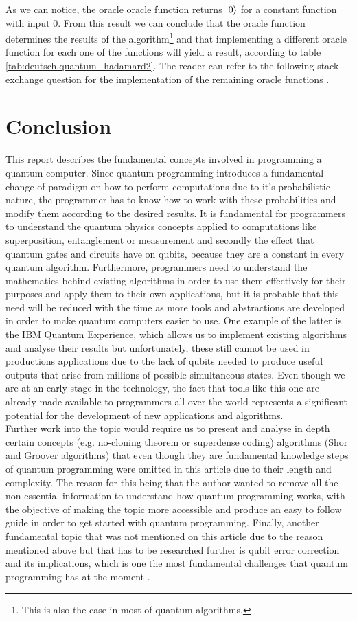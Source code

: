 \documentclass[12pt,a4paper]{scrartcl}
\begin{document}
As we can notice, the oracle oracle function returns $\ket{0}$ for a constant function with input 0. From this result we can conclude that the oracle function determines the results of the algorithm\footnote{This is also the case in most of quantum algorithms.} and that implementing a different oracle function for each one of the functions will yield a result, according to table \ref{tab:deutsch.quantum_hadamard2}. The reader can refer to the following stack-exchange question for the implementation of the remaining oracle functions \cite{veseli2020}.


\section{Conclusion}
This report describes the fundamental concepts involved in programming a quantum computer. Since quantum programming introduces a fundamental change of paradigm on how to perform computations due to it's probabilistic nature, the programmer has to know how to work with these probabilities and modify them according to the desired results. It is fundamental for programmers to understand the quantum physics concepts applied to computations like superposition, entanglement or measurement and secondly the effect that quantum gates and circuits have on qubits, because they are a constant in every quantum algorithm. Furthermore, programmers need to understand the mathematics behind existing algorithms in order to use them effectively for their purposes and apply them to their own applications, but it is probable that this need will be reduced  with the time as more tools and abstractions are developed in order to make quantum computers easier to use. One example of the latter is the IBM Quantum Experience, which allows us to implement existing algorithms and analyse their results but unfortunately, these still cannot be used in productions applications due to the lack of qubits needed to produce useful outputs that arise from millions of possible simultaneous states. Even though we are at an early stage in the technology, the fact that tools like this one are already made available to programmers all over the world represents a significant potential for the development of new applications and algorithms.\\
Further work into the topic would require us to present and analyse in depth certain concepts (e.g. no-cloning theorem or superdense coding) algorithms (Shor and Groover algorithms) that even though they are fundamental knowledge steps of quantum programming were omitted in this article due to their length and complexity. The reason for this being that the author wanted to remove all the non essential information to understand how quantum programming works, with the objective of making the topic more accessible and produce an easy to follow guide in order to get started with quantum programming. Finally, another fundamental topic that was not mentioned on this article due to the reason mentioned above but that has to be researched further is qubit error correction and its implications, which is one the most fundamental challenges that quantum programming has at the moment \cite{bernhardt2019quantum}.
\end{document}
